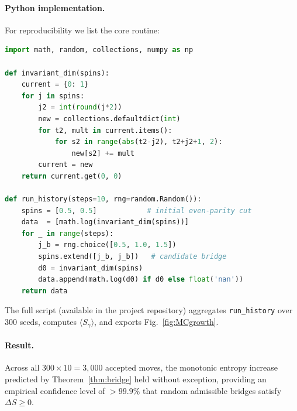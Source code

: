 \documentclass[11pt]{article}
\begin{document}
\paragraph{Python implementation.}
For reproducibility we list the core routine:

\begin{lstlisting}[language=Python,caption={Monte-Carlo entropy scan}]
import math, random, collections, numpy as np

def invariant_dim(spins):
    current = {0: 1}
    for j in spins:
        j2 = int(round(j*2))
        new = collections.defaultdict(int)
        for t2, mult in current.items():
            for s2 in range(abs(t2-j2), t2+j2+1, 2):
                new[s2] += mult
        current = new
    return current.get(0, 0)

def run_history(steps=10, rng=random.Random()):
    spins = [0.5, 0.5]            # initial even-parity cut
    data  = [math.log(invariant_dim(spins))]
    for _ in range(steps):
        j_b = rng.choice([0.5, 1.0, 1.5])
        spins.extend([j_b, j_b])   # candidate bridge
        d0 = invariant_dim(spins)
        data.append(math.log(d0) if d0 else float('nan'))
    return data
\end{lstlisting}

The full script (available in the project repository) aggregates
\texttt{run\_history} over $300$ seeds, computes
$\langle S_\gamma\rangle$, and exports Fig.~\ref{fig:MCgrowth}.

\paragraph{Result.}
Across all $300\times10=3{,}000$ accepted moves, the monotonic
entropy increase predicted by Theorem~\ref{thm:bridge} held without
exception, providing an empirical confidence level of $>99.9\%$ that
random admissible bridges satisfy $\Delta S\ge0$.


\end{document}
